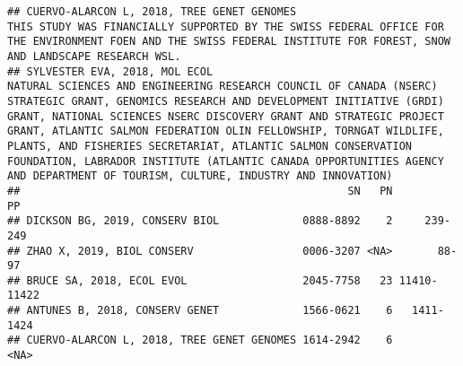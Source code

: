 \documentclass[]{article}
\begin{document}
\begin{verbatim}
## CUERVO-ALARCON L, 2018, TREE GENET GENOMES                                                                                                                                                                                                                                                                                                                                                                                                                                                                                                                                                                                                                                                                                                                                                                                                                                                                                                                                  THIS STUDY WAS FINANCIALLY SUPPORTED BY THE SWISS FEDERAL OFFICE FOR THE ENVIRONMENT FOEN AND THE SWISS FEDERAL INSTITUTE FOR FOREST, SNOW AND LANDSCAPE RESEARCH WSL.
## SYLVESTER EVA, 2018, MOL ECOL                                                                                                                                                                                                                                                                                                                                                                                                                                                                                                                                                                                                                                 NATURAL SCIENCES AND ENGINEERING RESEARCH COUNCIL OF CANADA (NSERC) STRATEGIC GRANT, GENOMICS RESEARCH AND DEVELOPMENT INITIATIVE (GRDI) GRANT, NATIONAL SCIENCES NSERC DISCOVERY GRANT AND STRATEGIC PROJECT GRANT, ATLANTIC SALMON FEDERATION OLIN FELLOWSHIP, TORNGAT WILDLIFE, PLANTS, AND FISHERIES SECRETARIAT, ATLANTIC SALMON CONSERVATION FOUNDATION, LABRADOR INSTITUTE (ATLANTIC CANADA OPPORTUNITIES AGENCY AND DEPARTMENT OF TOURISM, CULTURE, INDUSTRY AND INNOVATION)
##                                                   SN   PN          PP
## DICKSON BG, 2019, CONSERV BIOL             0888-8892    2     239-249
## ZHAO X, 2019, BIOL CONSERV                 0006-3207 <NA>       88-97
## BRUCE SA, 2018, ECOL EVOL                  2045-7758   23 11410-11422
## ANTUNES B, 2018, CONSERV GENET             1566-0621    6   1411-1424
## CUERVO-ALARCON L, 2018, TREE GENET GENOMES 1614-2942    6        <NA>

\end{verbatim}
\end{document}

